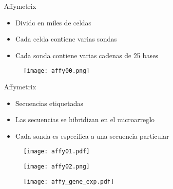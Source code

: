 \documentclass{beamer}
\begin{document}


\begin{frame}{Affymetrix}
\begin{itemize}
\item Divido en miles de celdas
\item Cada celda contiene varias sondas
\item Cada sonda contiene varias cadenas de 25 bases
\end{itemize}
\begin{figure}[H]
\centering
\texttt{[image: affy00.png]}
\end{figure}
\end{frame}

\begin{frame}{Affymetrix}
\begin{itemize}
\item Secuencias etiquetadas
\item Las secuencias se hibridizan en el microarreglo
\item Cada sonda es específica a una secuencia particular
\end{itemize}
\begin{figure}[H]
\centering
\texttt{[image: affy01.pdf]}
\end{figure}
\end{frame}

\begin{frame}
\begin{figure}[H]
\centering
\texttt{[image: affy02.png]}
\end{figure}
\end{frame}

\begin{frame}
\begin{figure}[H]
\centering
\texttt{[image: affy\_gene\_exp.pdf]}
\end{figure}
\end{frame}
\end{document}
